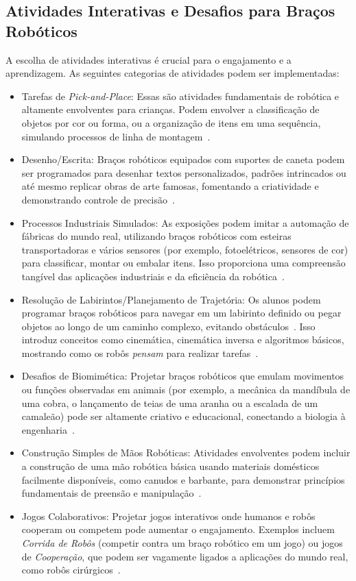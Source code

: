 \documentclass[%
  a4paper,%
  12pt,%
  fleqn,%
  english,%
  brazilian,%
]{article}
\begin{document}
\subsection{Atividades Interativas e Desafios para Braços Robóticos}
\label{sec:atividades_interativas}
A escolha de atividades interativas é crucial para o engajamento e a aprendizagem. As seguintes categorias de atividades podem ser implementadas:
	\begin{itemize}
		\item Tarefas de \emph{Pick-and-Place}: Essas são atividades fundamentais de robótica e altamente envolventes para crianças. Podem envolver a classificação de objetos por cor ou forma, ou a organização de itens em uma sequência, simulando processos de linha de montagem~\cite{robotlabDobotClassroomPack2025}.
		\item Desenho/Escrita: Braços robóticos equipados com suportes de caneta podem ser programados para desenhar textos personalizados, padrões intrincados ou até mesmo replicar obras de arte famosas, fomentando a criatividade e demonstrando controle de precisão~\cite{centrePointRoboticsGames2025}.
		\item Processos Industriais Simulados: As exposições podem imitar a automação de fábricas do mundo real, utilizando braços robóticos com esteiras transportadoras e vários sensores (por exemplo, fotoelétricos, sensores de cor) para classificar, montar ou embalar itens. Isso proporciona uma compreensão tangível das aplicações industriais e da eficiência da robótica~\cite{robotlabDobotClassroomPack2025}.
		\item Resolução de Labirintos/Planejamento de Trajetória: Os alunos podem programar braços robóticos para navegar em um labirinto definido ou pegar objetos ao longo de um caminho complexo, evitando obstáculos~\cite{rancholabsUltimateGuide2025}. Isso introduz conceitos como cinemática, cinemática inversa e algoritmos básicos, mostrando como os robôs \emph{pensam} para realizar tarefas~\cite{chang2025ConstructedResponse}.
		\item Desafios de Biomimética: Projetar braços robóticos que emulam movimentos ou funções observadas em animais (por exemplo, a mecânica da mandíbula de uma cobra, o lançamento de teias de uma aranha ou a escalada de um camaleão) pode ser altamente criativo e educacional, conectando a biologia à engenharia~\cite{ross2024BeyondExhibits}. 
		\item Construção Simples de Mãos Robóticas: Atividades envolventes podem incluir a construção de uma mão robótica básica usando materiais domésticos facilmente disponíveis, como canudos e barbante, para demonstrar princípios fundamentais de preensão e manipulação~\cite{scienceBuddiesRoboticsProjects2025}.
		\item Jogos Colaborativos: Projetar jogos interativos onde humanos e robôs cooperam ou competem pode aumentar o engajamento. Exemplos incluem \emph{Corrida de Robôs} (competir contra um braço robótico em um jogo) ou jogos de \emph{Cooperação}, que podem ser vagamente ligados a aplicações do mundo real, como robôs cirúrgicos~\cite{centrePointRoboticsGames2025}.
	\end{itemize}
\end{document}
